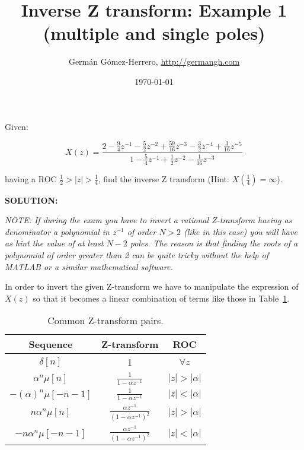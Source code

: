\documentclass[a4paper,11pt,oneside]{article}
\title{Inverse Z transform: Example 1 (multiple and single poles)}
\date{\today}
\author{Germ\'an G\'omez-Herrero, \url{http://germangh.com}}
\begin{document}
\maketitle

Given:

\[ 
X(z)=\frac{2-\frac{9}{4}z^{-1}-\frac{5}{2}z^{-2}+\frac{59}{16}z^{-3}-\frac{3}{2}z^{-4}+\frac{3}{16}z^{-5}}{1-\frac{5}{4}z^{-1}+\frac{1}{2}z^{-2}-\frac{1}{16}z^{-3}}
\]

having a ROC $\frac{1}{2}>|z|>\frac{1}{4}$, find the inverse Z transform (Hint: $X(\frac{1}{4})=\infty$).

\vspace{1cm}

\textbf{SOLUTION:}

\emph{NOTE: If during the exam you have to invert a rational Z-transform having as denominator a polynomial in $z^{-1}$ of order $N>2$ (like in this case) you will have as hint the value of at least $N-2$ poles. The reason is that finding the roots of a polynomial of order greater than 2 can be quite tricky without the help of MATLAB or a similar mathematical software.}

In order to invert the given Z-transform we have to manipulate the expression of $X(z)$ so that it becomes a linear combination of terms like those in Table~\ref{commonz}.

\begin{table}
\centering
\begin{tabular}{ccc}
\hline
Sequence & Z-transform & ROC\\
\hline
$\delta[n]$ & 1 & $\forall z$\vspace{.2cm}\\
$\alpha^n\mu[n]$ &  $\frac{1}{1-\alpha z^{-1}}$ & $|z|>|\alpha|$\vspace{.2cm}\\
$-(\alpha)^{n}\mu[-n-1]$ & $\frac{1}{1-\alpha z^{-1}}$ & $|z|<|\alpha|$\vspace{.2cm}\\
$n \alpha^n \mu[n]$ & $\frac{\alpha z^{-1}}{(1-\alpha z^{-1})^2}$ & $|z|>|\alpha|$\vspace{.2cm}\\
$-n\alpha^n \mu[-n-1]$ & $\frac{\alpha z^{-1}}{(1-\alpha z^{-1})^2}$ & $|z|<|\alpha|$\vspace{.2cm}\\
\hline
\end{tabular}
\caption{Common Z-transform pairs.}
\label{commonz}
\end{table}
\end{document}

